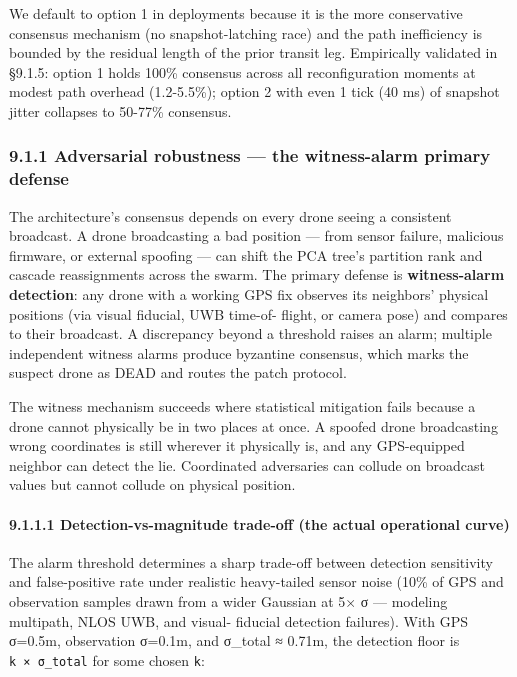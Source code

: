 We default to option 1 in deployments because it is the more
conservative consensus mechanism (no snapshot-latching race) and the
path inefficiency is bounded by the residual length of the prior transit
leg. Empirically validated in §9.1.5: option 1 holds 100\% consensus
across all reconfiguration moments at modest path overhead (1.2-5.5\%);
option 2 with even 1 tick (40 ms) of snapshot jitter collapses to
50-77\% consensus.

\subsubsection{9.1.1 Adversarial robustness --- the witness-alarm
primary
defense}\label{adversarial-robustness-the-witness-alarm-primary-defense}

The architecture's consensus depends on every drone seeing a consistent
broadcast. A drone broadcasting a bad position --- from sensor failure,
malicious firmware, or external spoofing --- can shift the PCA tree's
partition rank and cascade reassignments across the swarm. The primary
defense is \textbf{witness-alarm detection}: any drone with a working
GPS fix observes its neighbors' physical positions (via visual fiducial,
UWB time-of- flight, or camera pose) and compares to their broadcast. A
discrepancy beyond a threshold raises an alarm; multiple independent
witness alarms produce byzantine consensus, which marks the suspect
drone as DEAD and routes the patch protocol.

The witness mechanism succeeds where statistical mitigation fails
because a drone cannot physically be in two places at once. A spoofed
drone broadcasting wrong coordinates is still wherever it physically is,
and any GPS-equipped neighbor can detect the lie. Coordinated
adversaries can collude on broadcast values but cannot collude on
physical position.

\paragraph{9.1.1.1 Detection-vs-magnitude trade-off (the actual
operational
curve)}\label{detection-vs-magnitude-trade-off-the-actual-operational-curve}

The alarm threshold determines a sharp trade-off between detection
sensitivity and false-positive rate under realistic heavy-tailed sensor
noise (10\% of GPS and observation samples drawn from a wider Gaussian
at 5× σ --- modeling multipath, NLOS UWB, and visual- fiducial detection
failures). With GPS σ=0.5m, observation σ=0.1m, and σ\_total ≈ 0.71m,
the detection floor is \texttt{k\ ×\ σ\_total} for some chosen
\texttt{k}:

